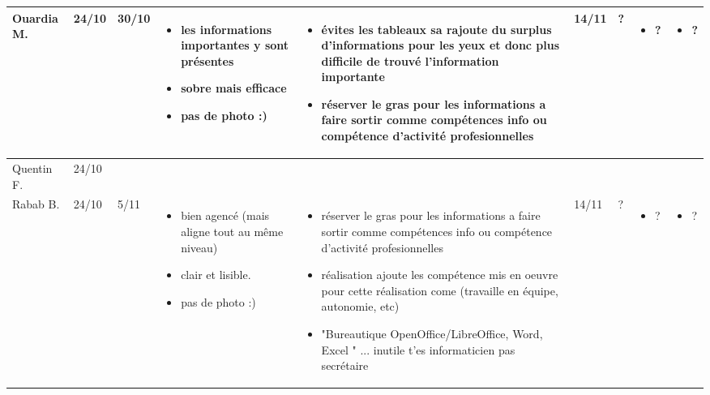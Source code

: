 \documentclass[a4paper,11pt]{article}
\begin{document}
\begin{landscape}
\begin{longtable}{|l|l|l|p{4cm}|p{4cm}|l|l|p{4cm}|p{4cm}|}
    Ouardia M.  & 24/10 & 30/10 %
				& \begin{itemize}
				  \item les informations importantes y sont présentes
				  \item sobre mais efficace
				  \item pas de photo :)
				  \end{itemize}
				& \begin{itemize}
				  \item évites les tableaux sa rajoute du surplus d'informations pour les yeux et donc plus difficile de trouvé l'information importante
				  \item réserver le gras pour les informations a faire sortir comme compétences info ou compétence d'activité profesionnelles
				  \end{itemize}
				&  14/11 & ? 
				& \begin{itemize}
				  \item ?
				  \end{itemize}
				& \begin{itemize}
				  \item ?
				  \end{itemize} \\ \hline

    Quentin F. & 24/10 & & & & & & & \\ \hline %

    Rabab B.  & 24/10 & 5/11 %
			  & \begin{itemize}
				\item bien agencé (mais aligne tout au même niveau)
				\item clair et lisible.
				\item pas de photo :)
				\end{itemize}
	  	      & \begin{itemize}
				\item réserver le gras pour les informations a faire sortir comme compétences info ou compétence d'activité profesionnelles
				\item réalisation ajoute les compétence mis en oeuvre pour cette réalisation come (travaille en équipe, autonomie, etc)
				\item "Bureautique  OpenOffice/LibreOffice, Word, Excel " ... inutile t'es informaticien pas secrétaire
				\end{itemize}
			  & 14/11 & ?
			  & \begin{itemize}
				\item ?
				\end{itemize}
			  & \begin{itemize}
				\item ?
				\end{itemize} \\ \hline


\end{longtable}
\end{landscape}
\end{document}
